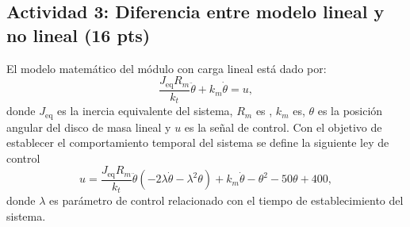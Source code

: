 \subsection{Actividad 3: Diferencia entre modelo lineal y no lineal (16 pts)}
El modelo matemático del módulo con carga lineal  está dado por:
\begin{equation}
	\frac{J_\mathrm{eq} R_m}{k_t} \ddot{\theta} + k_m \dot{\theta} = u,
	\label{eq:act1_modulo_disco}
\end{equation}
donde $J_\mathrm{eq}$ es la inercia equivalente del sistema, $R_m$ es , $k_m$ es, $\theta$ es la posición angular del disco de masa lineal y $u$ es la señal de control. Con el objetivo de establecer el comportamiento temporal del sistema se define la siguiente ley de control
\begin{equation}
	u  = \frac{J_\mathrm{eq} R_m}{k_t} \ddot{\theta} (-2\lambda \dot{\theta} - \lambda^2 \theta) + k_m \dot{\theta}- \theta^2 - 50 \theta + 400,
	\label{eq:act1_ley_de_control}
\end{equation}
donde $\lambda$ es parámetro de control relacionado con el tiempo de establecimiento del sistema.

